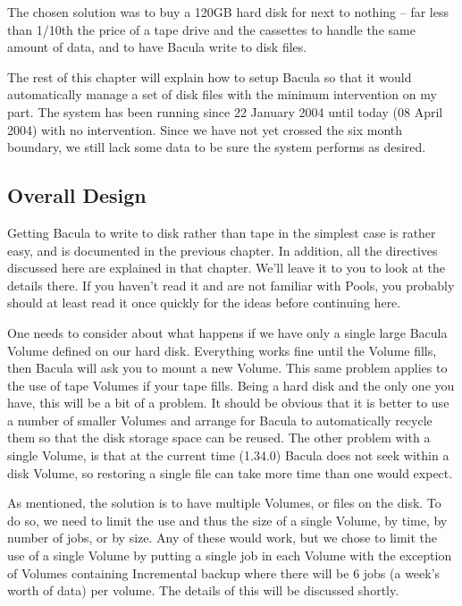 The chosen solution was to buy a 120GB hard disk for next to nothing -- far
less than 1/10th the price of a tape drive and the cassettes to handle the
same amount of data, and to have Bacula write to disk files. 

The rest of this chapter will explain how to setup Bacula so that it would
automatically manage a set of disk files with the minimum intervention on my
part. The system has been running since 22 January 2004 until today (08 April
2004) with no intervention. Since we have not yet crossed the six month
boundary, we still lack some data to be sure the system performs as desired. 
\label{OverallDesign}

\subsection*{Overall Design}

Getting Bacula to write to disk rather than tape in the simplest case is
rather easy, and is documented in the previous chapter. In addition, all the
directives discussed here are explained in that chapter. We'll leave it to you
to look at the details there. If you haven't read it and are not familiar with
Pools, you probably should at least read it once quickly for the ideas before
continuing here. 

One needs to consider about what happens if we have only a single large Bacula
Volume defined on our hard disk. Everything works fine until the Volume fills,
then Bacula will ask you to mount a new Volume. This same problem applies to
the use of tape Volumes if your tape fills. Being a hard disk and the only one
you have, this will be a bit of a problem. It should be obvious that it is
better to use a number of smaller Volumes and arrange for Bacula to
automatically recycle them so that the disk storage space can be reused. The
other problem with a single Volume, is that at the current time (1.34.0)
Bacula does not seek within a disk Volume, so restoring a single file can take
more time than one would expect. 

As mentioned, the solution is to have multiple Volumes, or files on the disk.
To do so, we need to limit the use and thus the size of a single Volume, by
time, by number of jobs, or by size. Any of these would work, but we chose to
limit the use of a single Volume by putting a single job in each Volume with
the exception of Volumes containing Incremental backup where there will be 6
jobs (a week's worth of data) per volume. The details of this will be
discussed shortly. 

